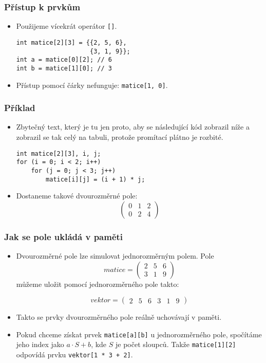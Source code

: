 \documentclass{beamer}
\newenvironment{itemizex}%
  {\large \begin{itemize}%
    \setlength{\itemsep}{8pt}%
    \setlength{\parskip}{8pt}}%
  {\end{itemize}}
\begin{document}
\begin{frame}[t,fragile]\frametitle{Přístup k prvkům} 
    \begin{itemizex}
        \item Použijeme vícekrát operátor \texttt{[]}.
\begin{verbatim} 
int matice[2][3] = {{2, 5, 6}, 
                    {3, 1, 9}};
int a = matice[0][2]; // 6
int b = matice[1][0]; // 3
\end{verbatim}
        \item Přístup pomocí čárky nefunguje: \texttt{matice[1, 0]}. 
    \end{itemizex}
\end{frame}


\begin{frame}[t,fragile]\frametitle{Příklad} 
\begin{itemizex}
    \item Zbytečný text, který je tu jen proto, aby se následující kód zobrazil níže a zobrazil se tak celý na tabuli, protože promítací plátno je rozbité. 

\begin{verbatim} 
int matice[2][3], i, j;
for (i = 0; i < 2; i++)
    for (j = 0; j < 3; j++)
        matice[i][j] = (i + 1) * j;
\end{verbatim}
    \item Dostaneme takové dvourozměrné pole:
$$
\begin{pmatrix}
0&1&2\\
0&2&4
\end{pmatrix}
$$
\end{itemizex}
\end{frame}


\begin{frame}[t,fragile]\frametitle{Jak se pole ukládá v paměti} 
    \begin{itemize}
        \item Dvourozměrné pole lze simulovat jednorozměrným polem. Pole
$$
matice=\begin{pmatrix}
2&5&6\\
3&1&9
\end{pmatrix}
$$
        můžeme uložit pomocí jednorozměrného pole takto:

$$
vektor=\begin{pmatrix}
2&5&6&3&1&9
\end{pmatrix}
$$
        \item Takto se prvky dvourozměrného pole reálně uchovávají v paměti. 
        \item Pokud chceme získat prvek \texttt{matice[a][b]} u jednorozměrného pole, spočítáme jeho index jako $a\cdot S+b$, kde $S$ je počet sloupců. Takže \texttt{matice[1][2]} odpovídá prvku \texttt{vektor[1 * 3 + 2]}.
    \end{itemize}
\end{frame}
\end{document}
